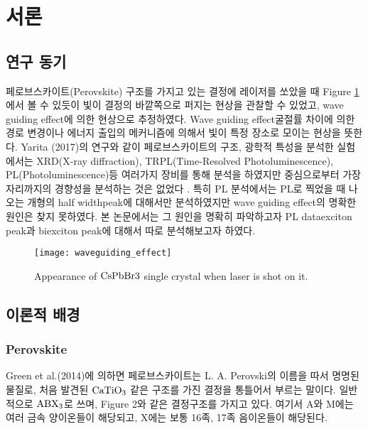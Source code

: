 
\section{서론}
\subsection{연구 동기}

페로브스카이트(Perovskite) 구조를 가지고 있는 결정에 레이저를 쏘았을 때 Figure \ref{fig:waveguide} 에서 볼 수 있듯이 빛이 결정의 바깥쪽으로 퍼지는 현상을 관찰할 수 있었고, wave guiding effect에 의한 현상으로 추정하였다. Wave guiding effect\는 굴절률 차이에 의한 경로 변경이나 에너지 출입의 메커니즘에 의해서 빛이 특정 장소로 모이는 현상을 뜻한다. Yarita (2017)의 연구와 같이 페로브스카이트의 구조, 광학적 특성을 분석한 실험에서는 XRD(X-ray diffraction), TRPL(Time-Resolved Photoluminescence), PL(Photoluminescence)등 여러가지 장비를 통해 분석을 하였지만 중심으로부터 가장자리까지의 경향성을 분석하는 것은 없었다 \cite{yarita2017dynamics}. 특히 PL 분석에서는 PL로 찍었을 때 나오는 개형의 half width\과 peak에 대해서만 분석하였지만 wave guiding effect의 명확한 원인은 찾지 못하였다. 본 논문에서는 그 원인을 명확히 파악하고자 PL data\를 exciton peak과 biexciton peak에 대해서 따로 분석해보고자 하였다. 

\begin{figure}[H]
	\begin{center}
			\texttt{[image: waveguiding\_effect]}
	\end{center}
	\caption{Appearance of $\rm CsPbBr3$ single crystal when laser is shot on it.}
	\label{fig:waveguide}  
\end{figure}

\subsection{이론적 배경}

\subsubsection{Perovskite}
Green et al.(2014)에 의하면 페로브스카이트는 L. A. Perovski의 이름을 따서 명명된 물질로, 처음 발견된 $\rm CaTiO_3$  같은 구조를 가진 결정을 통틀어서 부르는 말이다. 일반적으로 $\rm ABX_3$로 쓰며, Figure 2와 같은 결정구조를 가지고 있다. 여기서 A와 M에는 여러 금속 양이온들이 해당되고, X에는 보통 16족, 17족 음이온들이 해당된다.



